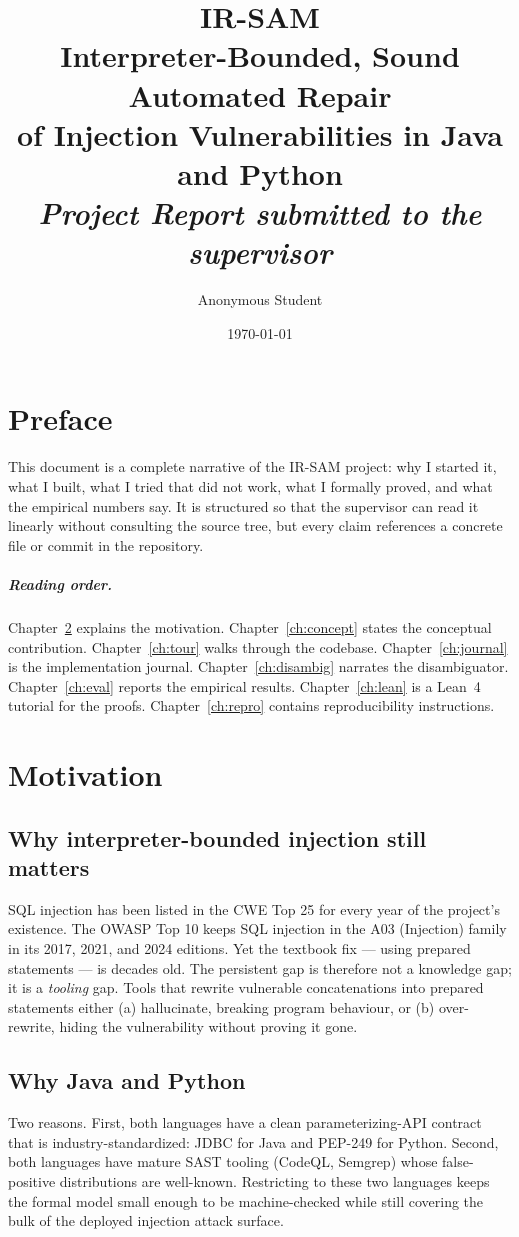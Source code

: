 \documentclass[a4paper,11pt]{report}
\title{
  \vspace{-2cm}
  \textbf{IR-SAM}\\[0.3em]
  \large Interpreter-Bounded, Sound Automated Repair\\of Injection Vulnerabilities in Java and Python\\[1em]
  \large \textit{Project Report submitted to the supervisor}
}
\author{Anonymous Student}
\date{\today}
\begin{document}
\maketitle

\tableofcontents
\clearpage

\chapter{Preface}
This document is a complete narrative of the IR-SAM project: why I started it, what I built, what I tried that did not work, what I formally proved, and what the empirical numbers say. It is structured so that the supervisor can read it linearly without consulting the source tree, but every claim references a concrete file or commit in the repository.

\paragraph{Reading order.} Chapter~\ref{ch:motivation} explains the motivation. Chapter~\ref{ch:concept} states the conceptual contribution. Chapter~\ref{ch:tour} walks through the codebase. Chapter~\ref{ch:journal} is the implementation journal. Chapter~\ref{ch:disambig} narrates the disambiguator. Chapter~\ref{ch:eval} reports the empirical results. Chapter~\ref{ch:lean} is a Lean~4 tutorial for the proofs. Chapter~\ref{ch:repro} contains reproducibility instructions.

\chapter{Motivation}\label{ch:motivation}
\section{Why interpreter-bounded injection still matters}
SQL injection has been listed in the CWE Top 25 for every year of the project's existence. The OWASP Top 10 keeps SQL injection in the A03 (Injection) family in its 2017, 2021, and 2024 editions. Yet the textbook fix --- using prepared statements --- is decades old. The persistent gap is therefore not a knowledge gap; it is a \emph{tooling} gap. Tools that rewrite vulnerable concatenations into prepared statements either (a) hallucinate, breaking program behaviour, or (b) over-rewrite, hiding the vulnerability without proving it gone.

\section{Why Java and Python}
Two reasons. First, both languages have a clean parameterizing-API contract that is industry-standardized: JDBC for Java and PEP-249 for Python. Second, both languages have mature SAST tooling (CodeQL, Semgrep) whose false-positive distributions are well-known. Restricting to these two languages keeps the formal model small enough to be machine-checked while still covering the bulk of the deployed injection attack surface.
\end{document}
